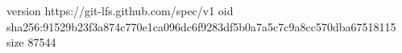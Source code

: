 version https://git-lfs.github.com/spec/v1
oid sha256:91529b23f3a874c770e1ca096dc6f9283df5b0a7a5c7c9a8cc570dba67518115
size 87544

